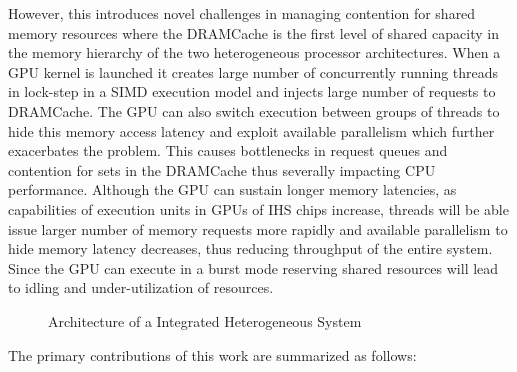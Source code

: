 \par However, this introduces novel challenges in managing contention for shared memory resources where the DRAMCache is the first level of shared capacity in the memory hierarchy of the two heterogeneous processor architectures. When a GPU kernel is launched it creates large number of concurrently running threads in lock-step in a SIMD execution model and injects large number of requests to DRAMCache. The GPU can also switch execution between groups of threads to hide this memory access latency and exploit available parallelism which further exacerbates the problem. This causes bottlenecks in request queues and contention for sets in the DRAMCache thus severally impacting CPU performance. Although the GPU can sustain longer memory latencies, as capabilities of execution units in GPUs of IHS chips increase, threads will be able issue larger number of memory requests more rapidly and available parallelism to hide memory latency decreases, thus reducing throughput of the entire system. Since the GPU can execute in a burst mode reserving shared resources will lead to idling and under-utilization of resources.


\begin{figure*}[!htb]
    \centering
    \hsacpu
    \caption{Architecture of a Integrated Heterogeneous System}
    \label{hsa-arch}
\end{figure*}
The primary contributions of this work are summarized as follows:

